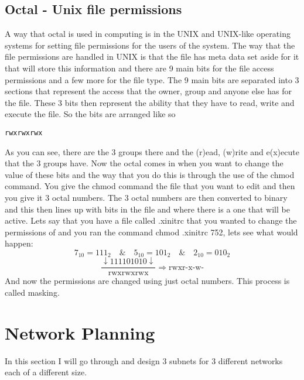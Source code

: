 \documentclass{article}
\begin{document}
\subsection{Octal - Unix file permissions}
A way that octal is used in computing is in the UNIX and UNIX-like operating systems for setting file permissions for the users of the system. The way that the file permissions are handled in UNIX is that the file has meta data set aside for it that will store this information and there are 9 main bits for the file access permissions and a few more for the file type. The 9 main bits are separated into 3 sections that represent the access that the owner, group and anyone else has for the file. These 3 bits then represent the ability that they have to read, write and execute the file. So the bits are arranged like so
\begin{verbatim}
rwxrwxrwx
\end{verbatim}
As you can see, there are the 3 groups there and the (r)ead, (w)rite and e(x)ecute that the 3 groups have. Now the octal comes in when you want to change the value of these bits and the way that you do this is through the use of the chmod command. You give the chmod command the file that you want to edit and then you give it 3 octal numbers. The 3 octal numbers are then converted to binary and this then lines up with bits in the file and where there is a one that will be active. Lets say that you have a file called .xinitrc that you wanted to change the permissions of and you ran the command chmod .xinitrc 752, lets see what would happen:
\[
	7_{10} = 111_{2} \quad \& \quad 5_{10} = 101_{2} \quad \& \quad 2_{10} = 010_{2}
\]
\[
	\frac{\downarrow111101010\downarrow}{\mbox{rwxrwxrwx}} \Rightarrow \mbox{rwxr-x-w-}
\]
And now the permissions are changed using just octal numbers. This process is called masking. 
\section{Network Planning}
In this section I will go through and design 3 subnets for 3 different networks each of a different size.
\end{document}
